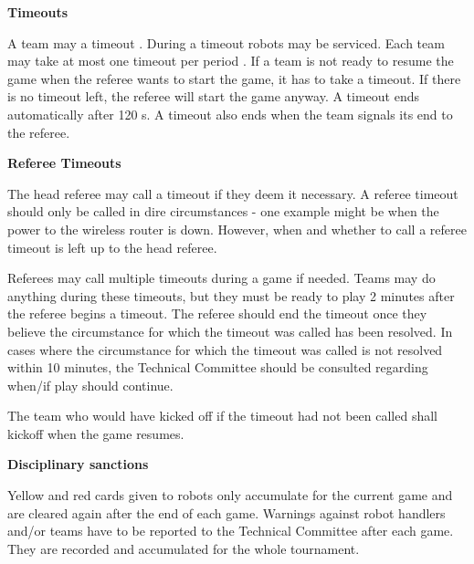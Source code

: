 \bigskip

{\bfseries Timeouts}

A team may   a timeout . During a timeout robots may be serviced. Each team may take at most one timeout per period . If a team is not ready to resume the game when the referee wants to start the game, it has to take a timeout. If there is no timeout left, the referee will start the game anyway. A timeout ends automatically after 120 s. A timeout also ends when the team signals its end to the referee.

\bigskip

{\bfseries Referee Timeouts}

The head referee may call a timeout   if they deem it necessary. A referee timeout should only be called in dire circumstances - one example might be when the power to the wireless router is down. However, when and whether to call a referee timeout is left up to the head referee.

Referees may call multiple timeouts during a game if needed. Teams may do anything during these timeouts, but they must be ready to play 2 minutes after the referee begins a timeout. The referee should end the timeout once they believe the circumstance for which the timeout was called has been resolved. In cases where the circumstance for which the timeout was called is not resolved within 10 minutes, the Technical Committee should be consulted regarding when/if play should continue.

The team who would have kicked off if the timeout had not been called shall kickoff when the game resumes.

\bigskip

{\bfseries Disciplinary sanctions}

Yellow and red cards given to robots only accumulate for the current game and are cleared again after the end of each game. Warnings against robot handlers and/or teams have to be reported to the Technical Committee after each game. They are recorded and accumulated for the whole tournament. 




